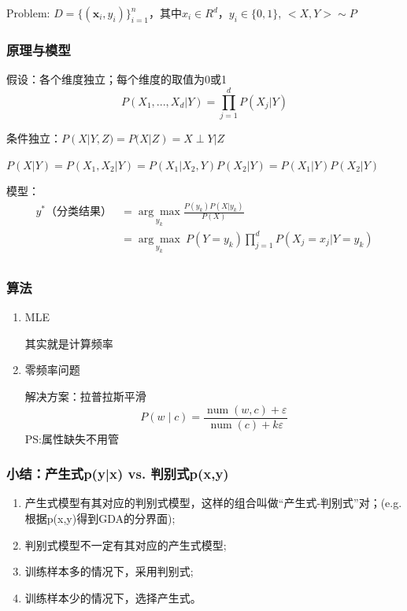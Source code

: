 \documentclass[UTF8]{ctexart}
\numberwithin{equation}{section}
\begin{document}
Problem: $D=\{( \boldsymbol{x}_{i},y_i)\}_{i=1}^{n}$，其中$x_i \in R^d$，$y_i\in \{0,1\}$,  $<X,Y> \sim P$

\dotfill

\subsubsection{原理与模型}

假设：各个维度独立；每个维度的取值为0或1
$$
P(X_1,...,X_d|Y)=\prod^d_{j=1}P(X_j|Y)
$$

\dotfill

 条件独立：$P(X|Y,Z)=P(X|Z)=X\perp Y|Z$
 
 $P(X|Y)=P(X_1,X_2|Y)=P(X_1|X_2,Y)P(X_2|Y)=P(X_1|Y)P(X_2|Y)$
 
 \dotfill

模型：
$$
\begin{aligned}
y^*（分类结果）&=\underset{y_k}{\arg \max } \frac{P(y_k)P(X|y_k)}{P(X)}\\
&=\underset{y_k}{\arg \max }~{P(Y=y_k)\prod_{j=1}^d P(X_j=x_j|Y=y_k)}\\
\end{aligned}
$$



\subsubsection{算法}
\begin{enumerate}
    \item MLE
    
    其实就是计算频率
    \item 零频率问题

解决方案：拉普拉斯平滑
$$
P(w \mid c)=\frac{\operatorname{num}(w, c)+\varepsilon}{\operatorname{num}(c)+k \varepsilon}
$$
PS:属性缺失不用管

\end{enumerate}


\subsubsection{小结：产生式p(y|x) vs. 判别式p(x,y)}
\begin{enumerate}
    \item 产生式模型有其对应的判别式模型，这样的组合叫做“产生式-判别式”对；(e.g. 根据p(x,y)得到GDA的分界面);
    \item 判别式模型不一定有其对应的产生式模型;
    \item 训练样本多的情况下，采用判别式;
    \item 训练样本少的情况下，选择产生式。
\end{enumerate}
\end{document}
